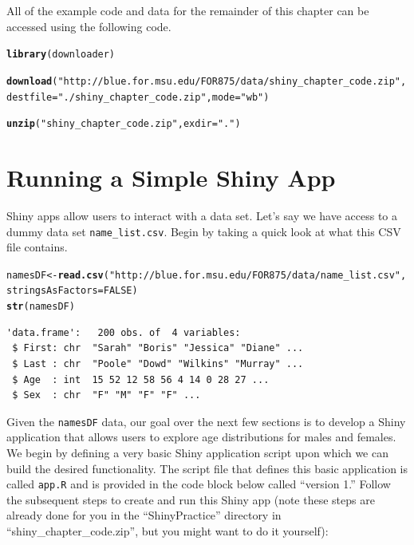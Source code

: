 \documentclass[12pt,oneside]{book}\usepackage[]{graphicx}\usepackage[]{color}
\makeatletter
\newcommand{\hlnum}[1]{\textcolor[rgb]{0.686,0.059,0.569}{#1}}%
\newcommand{\hlstr}[1]{\textcolor[rgb]{0.192,0.494,0.8}{#1}}%
\newcommand{\hlstd}[1]{\textcolor[rgb]{0.345,0.345,0.345}{#1}}%
\newcommand{\hlkwb}[1]{\textcolor[rgb]{0.69,0.353,0.396}{#1}}%
\newcommand{\hlkwc}[1]{\textcolor[rgb]{0.333,0.667,0.333}{#1}}%
\newcommand{\hlkwd}[1]{\textcolor[rgb]{0.737,0.353,0.396}{\textbf{#1}}}%
\newenvironment{kframe}{%
 \def\at@end@of@kframe{}%
 \ifinner\ifhmode%
  \def\at@end@of@kframe{\end{minipage}}%
  \begin{minipage}{\columnwidth}%
 \fi\fi%
 \def\FrameCommand##1{\hskip\@totalleftmargin \hskip-\fboxsep
 \colorbox{shadecolor}{##1}\hskip-\fboxsep
     \hskip-\linewidth \hskip-\@totalleftmargin \hskip\columnwidth}%
 \MakeFramed {\advance\hsize-\width
   \@totalleftmargin\z@ \linewidth\hsize
   \@setminipage}}%
 {\par\unskip\endMakeFramed%
 \at@end@of@kframe}
\newenvironment{knitrout}{}{} %
\makeatother
\begin{document}
All of the example code and data for the remainder of this chapter can be accessed using the following code.
\begin{knitrout}
\color{fgcolor}\begin{kframe}
\begin{alltt}
\hlkwd{library}\hlstd{(downloader)}

\hlkwd{download}\hlstd{(}\hlstr{"http://blue.for.msu.edu/FOR875/data/shiny_chapter_code.zip"}\hlstd{,}
    \hlkwc{destfile} \hlstd{=} \hlstr{"./shiny_chapter_code.zip"}\hlstd{,} \hlkwc{mode} \hlstd{=} \hlstr{"wb"}\hlstd{)}

\hlkwd{unzip}\hlstd{(}\hlstr{"shiny_chapter_code.zip"}\hlstd{,} \hlkwc{exdir} \hlstd{=} \hlstr{"."}\hlstd{)}
\end{alltt}
\end{kframe}
\end{knitrout}

\section{Running a Simple Shiny App}

Shiny apps allow users to interact with a data set. Let's say we have access to a dummy data set \verb+name_list.csv+. Begin by taking a quick look at what this CSV file contains.

\begin{knitrout}
\color{fgcolor}\begin{kframe}
\begin{alltt}
\hlstd{namesDF} \hlkwb{<-} \hlkwd{read.csv}\hlstd{(}\hlstr{"http://blue.for.msu.edu/FOR875/data/name_list.csv"}\hlstd{,}
    \hlkwc{stringsAsFactors} \hlstd{=} \hlnum{FALSE}\hlstd{)}
\hlkwd{str}\hlstd{(namesDF)}
\end{alltt}
\begin{verbatim}
'data.frame':	200 obs. of  4 variables:
 $ First: chr  "Sarah" "Boris" "Jessica" "Diane" ...
 $ Last : chr  "Poole" "Dowd" "Wilkins" "Murray" ...
 $ Age  : int  15 52 12 58 56 4 14 0 28 27 ...
 $ Sex  : chr  "F" "M" "F" "F" ...
\end{verbatim}
\end{kframe}
\end{knitrout}

Given the \verb+namesDF+ data, our goal over the next few sections is to develop a Shiny application that allows users to explore age distributions for males and females. We begin by defining a very basic Shiny application script upon which we can build the desired functionality. The script file that defines this basic application is called \verb+app.R+ and is provided in the code block below called ``version 1.'' Follow the subsequent steps to create and run this Shiny app (note these steps are already done for you in the ``ShinyPractice'' directory in ``shiny\_chapter\_code.zip'', but you might want to do it yourself):
\end{document}
